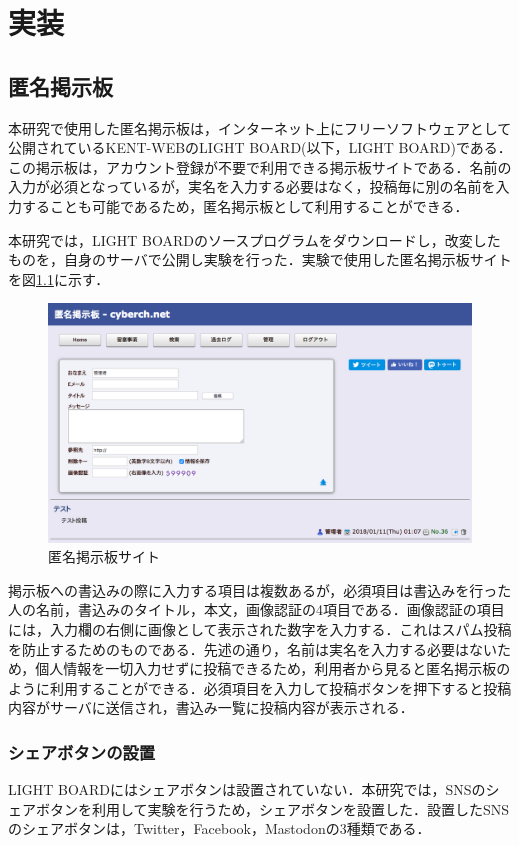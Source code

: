 \documentclass[10pt, a4paper]{jreport}
\begin{document}
\chapter{実装}
\section{匿名掲示板}\label{sec: bbs}
本研究で使用した匿名掲示板は，インターネット上にフリーソフトウェアとして公開されているKENT-WEBのLIGHT BOARD(以下，LIGHT BOARD)である．この掲示板は，アカウント登録が不要で利用できる掲示板サイトである．名前の入力が必須となっているが，実名を入力する必要はなく，投稿毎に別の名前を入力することも可能であるため，匿名掲示板として利用することができる．

本研究では，LIGHT BOARDのソースプログラムをダウンロードし，改変したものを，自身のサーバで公開し実験を行った．実験で使用した匿名掲示板サイトを図\ref{fig: bbs_screenshot}に示す．

\begin{figure}[H]
	\begin{center}
		\includegraphics[width=130mm]{figures/bbs_screenshot.png}
	\end{center}
	\caption{匿名掲示板サイト}
	\label{fig: bbs_screenshot}
\end{figure}

掲示板への書込みの際に入力する項目は複数あるが，必須項目は書込みを行った人の名前，書込みのタイトル，本文，画像認証の4項目である．画像認証の項目には，入力欄の右側に画像として表示された数字を入力する．これはスパム投稿を防止するためのものである．先述の通り，名前は実名を入力する必要はないため，個人情報を一切入力せずに投稿できるため，利用者から見ると匿名掲示板のように利用することができる．必須項目を入力して投稿ボタンを押下すると投稿内容がサーバに送信され，書込み一覧に投稿内容が表示される．

\subsection{シェアボタンの設置}
LIGHT BOARDにはシェアボタンは設置されていない．本研究では，SNSのシェアボタンを利用して実験を行うため，シェアボタンを設置した．設置したSNSのシェアボタンは，Twitter，Facebook，Mastodonの3種類である．
\end{document}
